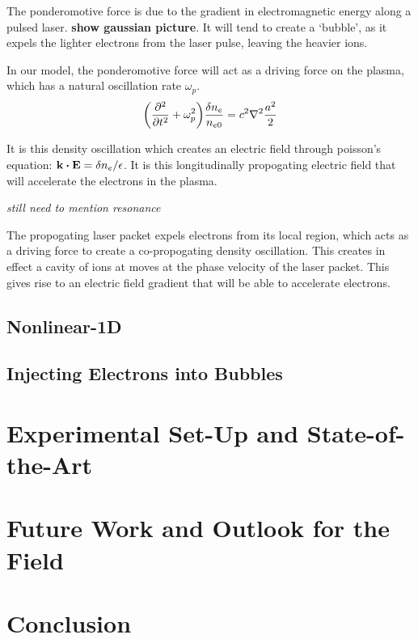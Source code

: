 \documentclass[12pt, titlepage]{caesar_book}
\begin{document}
The ponderomotive force is due to the gradient in electromagnetic energy along a 
pulsed laser. {\bf show gaussian picture}. It will tend to create a `bubble', as 
it expels the lighter electrons from the laser pulse, leaving the heavier ions.

In our model, the ponderomotive force will act as a driving force on the plasma,
which has a natural oscillation rate $\omega_p$.  \begin{equation}
    \label{eq:linear density oscillation}
    \qty(\pdv[2]{}{t} +\omega_p^2) \frac{\delta n_e}{n_{e0}} = c^2 \laplacian{ 
    \frac{a^2}{2}}
\end{equation}

It is this density oscillation which creates an electric field through poisson's 
equation: $\vb{k}\dotproduct\vb{E} =\delta n_e/\epsilon$. It is this
longitudinally propogating electric field that will accelerate the electrons in 
the plasma.
 
{\it still need to mention resonance}

The propogating laser packet expels electrons from its local region, which acts
as a driving force to create a co-propogating density oscillation. This creates 
in effect a cavity of ions at moves at the phase velocity of the laser packet.  
This gives rise to an electric field gradient that will be able to accelerate 
electrons.

\subsection{Nonlinear-1D}

\subsection{Injecting Electrons into Bubbles}

\section{Experimental Set-Up and State-of-the-Art}

\section{Future Work and Outlook for the Field}

\section{Conclusion}
\end{document}
